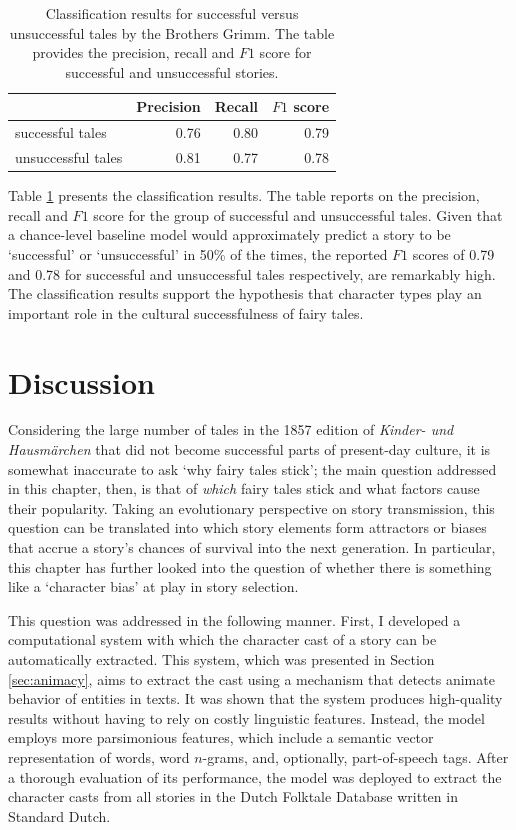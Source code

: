 \begin{table}
\centering
\begin{tabular}{lrrr}
\toprule
                   & Precision & Recall & $F1$ score \\ \midrule
successful tales   & 0.76      & 0.80   & 0.79    \\
unsuccessful tales & 0.81      & 0.77   & 0.78    \\
\bottomrule
\end{tabular}
\caption[Classification results for successful versus unsuccessful tales by the Brother Grimm.]{Classification results for successful versus unsuccessful tales by the Brothers Grimm. The table provides the precision, recall and $F1$ score for successful and unsuccessful stories.}
\label{tab:animacy-grimm-classification}
\end{table}

Table \ref{tab:animacy-grimm-classification} presents the classification results. The table reports on the precision, recall and $F1$ score for the group of successful and unsuccessful tales. Given that a chance-level baseline model would approximately predict a story to be `successful' or `unsuccessful' in 50\% of the times, the reported $F1$ scores of 0.79 and 0.78 for successful and unsuccessful tales respectively, are remarkably high. The classification results support the hypothesis that character types play an important role in the cultural successfulness of fairy tales. 


\section{Discussion}\label{sec:animacydiscussion}

Considering the large number of tales in the 1857 edition of \emph{Kinder- und Hausmärchen} that did not become successful parts of present-day culture, it is somewhat inaccurate to ask `why fairy tales stick'; the main question addressed in this chapter, then, is that of \emph{which} fairy tales stick and what factors cause their popularity. Taking an evolutionary perspective on story transmission, this question can be translated into which story elements form attractors or biases that accrue a story's chances of survival into the next generation. In particular, this chapter has further looked into the question of whether there is something like a `character bias' at play in story selection.

This question was addressed in the following manner. First, I developed a computational system with which the character cast of a story can be automatically extracted. This system, which was presented in Section \ref{sec:animacy}, aims to extract the cast using a mechanism that detects animate behavior of entities in texts. It was shown that the system produces high-quality results without having to rely on costly linguistic features. Instead, the model employs more parsimonious features, which include a semantic vector representation of words, word $n$-grams, and, optionally, part-of-speech tags. After a thorough evaluation of its performance, the model was deployed to extract the character casts from all stories in the Dutch Folktale Database written in Standard Dutch.

